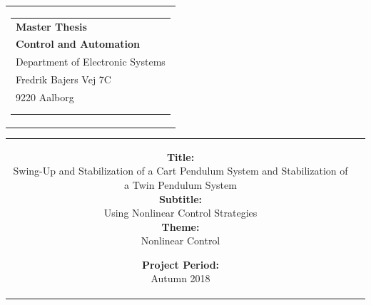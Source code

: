 %
% 
\begin{nopagebreak}
{\samepage 

\begin{tabular}{r}
\parbox{\textwidth}{  \vspace{-1cm}
\hfill \hspace{2cm} \parbox{8cm}{\begin{tabular}{l} %
{\small \textbf{\textcolor{aaublue}{\colorbox{white}{Master Thesis}}}}\\
{\small \textbf{\textcolor{aaublue}{Control and Automation}}}\\ 
{\small \textcolor{aaublue}{Department of Electronic Systems}}\\
{\small \textcolor{aaublue}{Fredrik Bajers Vej 7C}}\\
{\small \textcolor{aaublue}{9220 Aalborg}} \vspace{1.2cm}\\
 \\
\vspace{-2.5cm}
\end{tabular}}}
\end{tabular}

\begin{tabular}{cc}
\parbox{7cm}{

\textbf{Title:} \\
Swing-Up and Stabilization of a Cart Pendulum System and  Stabilization of a Twin Pendulum System \\

\textbf{Subtitle:} \\
Using Nonlinear Control Strategies \\

\textbf{Theme:} \\
\small{Nonlinear Control
\\
}

\parbox{8cm}{

\textbf{Project Period:}\\
Autumn 2018\\
   
}}
\end{tabular}}
\end{nopagebreak}
